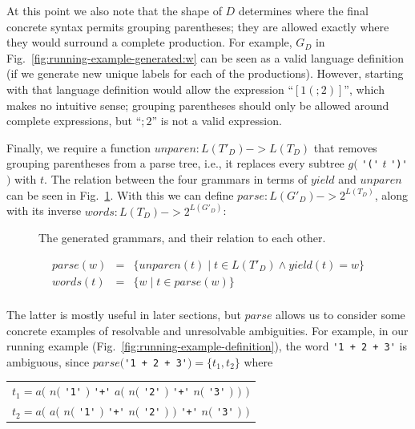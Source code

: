\documentclass[acmsmall,review,anonymous]{acmart}\settopmatter{printfolios=true,printccs=false,printacmref=false}
\newcommand{\yield}{\mathit{yield}} %
\newcommand{\semantic}{\mathit{unparen}} %
\newcommand{\parse}{\mathit{parse}} %
\newcommand{\words}{\mathit{words}} %
\begin{document}
At this point we also note that the shape of $D$ determines where the final concrete syntax permits grouping parentheses; they are allowed exactly where they would surround a complete production. For example, $G_D$ in Fig.~\ref{fig:running-example-generated:w} can be seen as a valid language definition (if we generate new unique labels for each of the productions). However, starting with that language definition would allow the expression ``$[1(;2)]$'', which makes no intuitive sense; grouping parentheses should only be allowed around complete expressions, but ``$;2$'' is not a valid expression.

Finally, we require a function $\semantic : L(T'_D) -> L(T_D)$ that removes grouping parentheses from a parse tree, i.e., it replaces every subtree $g($ \verb|'('| $t$ \verb|')'| $)$ with $t$. The relation between the four grammars in terms of $\yield$ and $\semantic$ can be seen in Fig.~\ref{fig:grammar-square}. With this we can define $\parse : L(G'_D) -> 2^{L(T_D)}$, along with its inverse $\words : L(T_D) -> 2^{L(G'_D)}$:

\begin{figure}
  \caption{The generated grammars, and their relation to each other.}
  \label{fig:grammar-square}
\end{figure}

$$
\begin{array}{rcl}
\parse(w) & = & \{ \semantic(t) \mid t \in L(T'_D) \land \yield(t) = w \} \\
\words(t) & = & \{ w \mid t \in \parse(w) \} \\
\end{array}
$$

\noindent The latter is mostly useful in later sections, but $\parse$ allows us to consider some concrete examples of resolvable and unresolvable ambiguities. For example, in our running example (Fig.~\ref{fig:running-example-definition}), the word \verb|'1 + 2 + 3'| is ambiguous, since $\parse($\verb|'1 + 2 + 3'|$) = \{t_1, t_2\}$ where

\begin{center}
  \begin{tabular}{l}
    $t_1 = a($ \hphantom{$a($} $n($ \verb|'1'| $)$ \verb|'+'| $a($ $n($ \verb|'2'| $)$ \hphantom{$)$} \verb|'+'| $n($ \verb|'3'| $)$ $)$ $)$ \\
    $t_2 = a($ $a($ $n($ \verb|'1'| $)$ \verb|'+'| \hphantom{$a($} $n($ \verb|'2'| $)$ $)$ \verb|'+'| $n($ \verb|'3'| $)$ \hphantom{$)$} $)$ \\
  \end{tabular}
\end{center}
\end{document}
